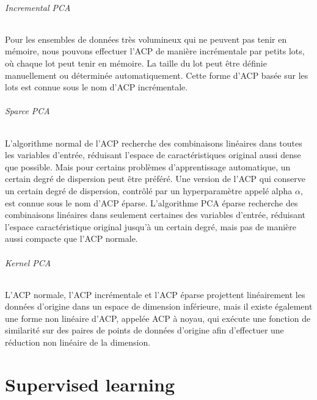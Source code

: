 \documentclass[../../cs-notes.tex]{subfiles}
\begin{document}
	\paragraph{Incremental PCA} Pour les ensembles de données très volumineux qui ne peuvent pas tenir en mémoire, nous pouvons effectuer l'ACP de manière incrémentale par petits lots, où chaque lot peut tenir en mémoire. La taille du lot peut être définie manuellement ou déterminée automatiquement. Cette forme d'ACP basée sur les lots est connue sous le nom d'ACP incrémentale.

	\paragraph{Sparce PCA} L'algorithme normal de l'ACP recherche des combinaisons linéaires dans toutes les variables d'entrée, réduisant l'espace de caractéristiques original aussi dense que possible.
	Mais pour certains problèmes d'apprentissage automatique, un certain degré de dispersion peut être préféré.
	Une version de l'ACP qui conserve un certain degré de dispersion, contrôlé par un hyperparamètre appelé alpha \(\alpha\), est connue sous le nom d'ACP éparse.
	L'algorithme PCA éparse recherche des combinaisons linéaires dans seulement certaines des variables d'entrée, réduisant l'espace caractéristique original jusqu'à un certain degré, mais pas de manière aussi compacte que l'ACP normale.

	\paragraph{Kernel PCA}
	L'ACP normale, l'ACP incrémentale et l'ACP éparse projettent linéairement les données d'origine dans un espace de dimension inférieure, mais il existe également une forme non linéaire d'ACP, appelée ACP à noyau, qui exécute une fonction de similarité sur des paires de points de données d'origine afin d'effectuer une réduction non linéaire de la dimension.

	\part{Supervised learning}

	
	
	
	
	
	
	
	
	
	
\end{document}
